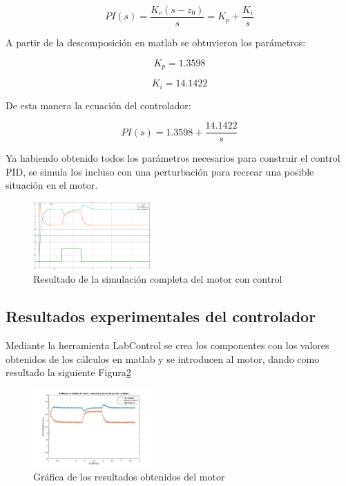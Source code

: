 \documentclass[conference]{IEEEtran}
\begin{document}
\begin{equation}
    PI(s)= \dfrac{K_c(s-z_0)}{s}= K_p + \dfrac{K_i}{s}
    \label{EQ_2}
\end{equation}

A partir de la descomposición en matlab se obtuvieron los parámetros:

\begin{equation}
    K_p=1.3598
    \label{EQ_4}
\end{equation}

\begin{equation}
    K_i=14.1422
    \label{EQ_5}
\end{equation}

De esta manera la ecuación del controlador:

\begin{equation}
    PI(s)= 1.3598 + \dfrac{14.1422}{s}
    \label{EQ_6}
\end{equation}

Ya habiendo obtenido todos los parámetros necesarios para construir el control PID, se simula los incluso con una perturbación para recrear una posible situación en el motor.

\begin{figure}[h]
\centering
\includegraphics[width=0.4\textwidth]{images/Sumalcioncompleta.png}
\caption{Resultado de la simulación completa del motor con control}
\label{fig:RSF}
\end{figure}

\subsection{Resultados experimentales del controlador}

Mediante la herramienta LabControl se crea los componentes con los valores obtenidos de los cálculos en matlab y se introducen al motor, dando como resultado la siguiente Figura\ref{fig:R_5}
 
\begin{figure}[h]
\centering
\includegraphics[width=0.4\textwidth]{images/RESULTADOS_MOTOR_CD.jpg}
\caption{Gráfica de los resultados obtenidos del motor}
\label{fig:R_5}
\end{figure}
\end{document}
